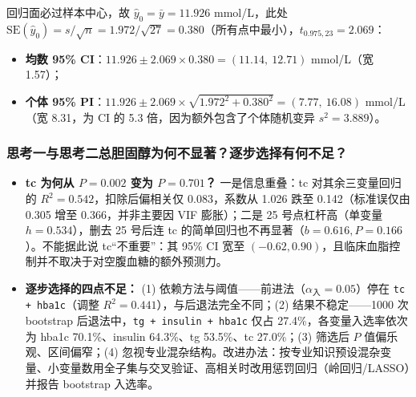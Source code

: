 回归面必过样本中心，故 $\hat y_0=\bar y=11.926$ mmol/L，此处 $\mathrm{SE}(\hat y_0)=s/\sqrt{n}=1.972/\sqrt{27}=0.380$（所有点中最小），$t_{0.975,23}=2.069$：
\begin{itemize}
\item \textbf{均数 95\% CI}：$11.926\pm 2.069\times 0.380=(11.14,\ 12.71)$ mmol/L（宽 1.57）；
\item \textbf{个体 95\% PI}：$11.926\pm 2.069\times\sqrt{1.972^2+0.380^2}=(7.77,\ 16.08)$ mmol/L（宽 8.31，为 CI 的 5.3 倍，因为额外包含了个体随机变异 $s^2=3.889$）。
\end{itemize}

\subsubsection*{思考一与思考二\quad 总胆固醇为何不显著？逐步选择有何不足？}


\begin{itemize}
\item \textbf{tc 为何从 $P=0.002$ 变为 $P=0.701$？} 一是信息重叠：tc 对其余三变量回归的 $R^2=0.542$，扣除后偏相关仅 0.083，系数从 1.026 跌至 0.142（标准误仅由 0.305 增至 0.366，并非主要因 VIF 膨胀）；二是 25 号点杠杆高（单变量 $h=0.534$），删去 25 号后连 tc 的简单回归也不再显著（$b=0.616,P=0.166$）。不能据此说 tc“不重要”：其 95\% CI 宽至 $(-0.62,0.90)$，且临床血脂控制并不取决于对空腹血糖的额外预测力。
\item \textbf{逐步选择的四点不足：} (1) 依赖方法与阈值——前进法（$\alpha_{}=0.05$）停在 \texttt{tc + hba1c}（调整 $R^2=0.441$），与后退法完全不同；(2) 结果不稳定——1000 次 bootstrap 后退法中，\texttt{tg + insulin + hba1c} 仅占 27.4\%，各变量入选率依次为 hba1c 70.1\%、insulin 64.3\%、tg 53.5\%、tc 27.0\%；(3) 筛选后 $P$ 值偏乐观、区间偏窄；(4) 忽视专业混杂结构。改进办法：按专业知识预设混杂变量、小变量数用全子集与交叉验证、高相关时改用惩罚回归（岭回归/LASSO）并报告 bootstrap 入选率。
\end{itemize}

